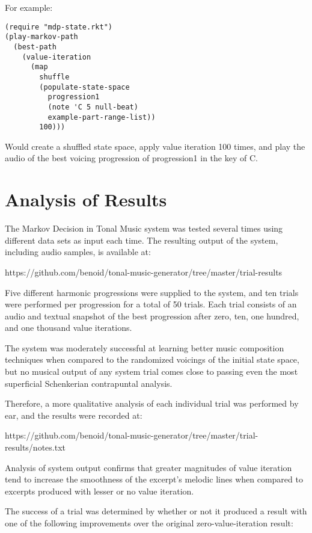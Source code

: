 \documentclass{chi2009}
\begin{document}
For example:

\begin{lstlisting}[language=LISP]
(require "mdp-state.rkt")
(play-markov-path 
  (best-path  
    (value-iteration 
      (map
        shuffle 
        (populate-state-space 
          progression1
          (note 'C 5 null-beat)
          example-part-range-list))               
        100)))       
\end{lstlisting}   
     
Would create a shuffled state space, apply value iteration 100 times, and play the audio of the best voicing progression of progression1 in the key of C.  




\section{Analysis of Results}

The Markov Decision in Tonal Music system was tested several times using different data sets as input each time.  The resulting output of the system, including audio samples, is available  at:

https://github.com/benoid/tonal-music-generator/tree/master/trial-results

Five different harmonic progressions were supplied to the system, and ten trials were performed per progression for a total of 50 trials.  Each trial consists of an audio and textual snapshot of the best progression after zero, ten, one hundred, and one thousand value iterations.  

The system was moderately successful at learning better music composition techniques when compared to the randomized voicings of the initial state space, but no musical output of any system trial comes close to passing even the most superficial Schenkerian contrapuntal analysis. 

Therefore, a more qualitative analysis of each individual trial was performed by ear, and the results were recorded at:

https://github.com/benoid/tonal-music-generator/tree/master/trial-results/notes.txt

Analysis of system output confirms that greater magnitudes of value iteration tend to increase the smoothness of the excerpt's melodic lines when compared to excerpts produced with lesser or no value iteration.  

The success of a trial was determined by whether or not it produced a result with one of the following improvements over the original zero-value-iteration result:
\end{document}
